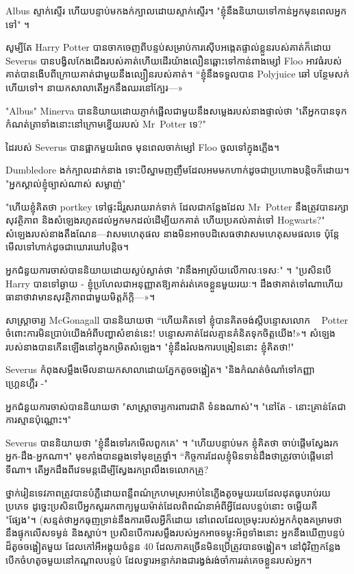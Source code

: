 {{{Albus ស្ទាក់ស្ទើរ ហើយបន្ទាប់មកងក់ក្បាលដោយស្ទាក់ស្ទើរ។ "ខ្ញុំនឹងនិយាយទៅកាន់អ្នកមុនពេលអ្នកទៅ" ។

\later

សូម្បីតែ Harry Potter បានចាកចេញពីបន្ទប់សម្រាប់ការស៊ើបអង្កេតផ្ទាល់ខ្លួនរបស់គាត់ក៏ដោយ Severus បានបង្វិលកែងជើងរបស់គាត់ហើយដើរយ៉ាងលឿនឆ្ពោះទៅកាន់ពាងម្សៅ Floo អាវធំរបស់គាត់បានងើបពីក្រោយគាត់ជាមួយនឹងល្បឿនរបស់គាត់។ “ខ្ញុំនឹងទទួលបាន Polyjuice ឆៅ បន្ថែមសក់ ហើយទៅ។ នាយក​សាលា​តើ​អ្នក​នឹង​ឈរ​នៅ​ក្បែរ—»

"Albus" Minerva បាននិយាយដោយភ្ញាក់ផ្អើលជាមួយនឹងសម្លេងរបស់នាងផ្ទាល់ថា "តើអ្នកបានទុកកំណត់ត្រាទាំងនោះនៅក្រោមខ្នើយរបស់ Mr~Potter ទេ?"

ដៃរបស់ Severus បានផ្អាកមួយរំពេច មុនពេលចាក់ម្សៅ Floo ចូលទៅក្នុងភ្លើង។

Dumbledore ងក់ក្បាលដាក់នាង ទោះបីស្នាមញញឹមដែលអមមកហាក់ដូចជាប្រហោងបន្តិចក៏ដោយ។ "អ្នកស្គាល់ខ្ញុំច្បាស់ណាស់ សម្លាញ់"

"ហើយខ្ញុំគិតថា portkey ទៅផ្ទះដ៏រួសរាយរាក់ទាក់ ដែលជាកន្លែងដែល Mr~Potter នឹងត្រូវបានរក្សាសុវត្ថិភាព និងសំឡេងរហូតដល់អ្នកមកដល់ដើម្បីយកគាត់ ហើយប្រគល់គាត់ទៅ Hogwarts?" សំឡេងរបស់នាងតឹងណែន—វាសមហេតុផល នាងមិនអាចបដិសេធថាវាសមហេតុសមផលទេ ប៉ុន្តែមើលទៅហាក់ដូចជាឃោរឃៅបន្តិច។

អ្នកជំនួយការចាស់បាននិយាយដោយស្ងប់ស្ងាត់ថា "វានឹងអាស្រ័យលើកាលៈទេសៈ" ។ "ប្រសិនបើ Harry បានទៅឆ្ងាយ - ខ្ញុំប្រហែលជាអនុញ្ញាតឱ្យគាត់រត់គេចខ្លួនមួយរយៈ។ ដឹង​ថា​គាត់​ទៅ​ណា​ហើយ​ធានា​ថា​វា​មាន​សុវត្ថិភាព​ជាមួយ​មិត្តភ័ក្ដិ—»។

សាស្ត្រាចារ្យ McGonagall បាននិយាយថា “ហើយគិតទៅ ខ្ញុំបានគិតចង់ស្តីបន្ទោសលោក ~ Potter ចំពោះការមិនប្រាប់យើងអំពីបញ្ហាសំខាន់នេះ! បន្ទោស​គាត់​ដែល​គ្មាន​គំនិត​ទុក​ចិត្ត​យើង!»។ សំឡេងរបស់នាងបានកើនឡើងនៅក្នុងកម្រិតសំឡេង។ "ខ្ញុំនឹងរំលងការបង្រៀននោះ ខ្ញុំគិតថា!"

Severus កំពុងសម្លឹងមើលនាយកសាលាដោយភ្នែកតូចចង្អៀត។ "និងកំណត់ចំណាំទៅកញ្ញា ~ ហ្គ្រេនហ្គឺរ -"

អ្នកជំនួយការចាស់បាននិយាយថា "សាស្ត្រាចារ្យការពារជាតិ ទំនងណាស់"។ "នៅតែ - នោះគ្រាន់តែជាការស្មានប៉ុណ្ណោះ។"

Severus បាននិយាយថា "ខ្ញុំនឹងទៅរកមើលពួកគេ" ។ "ហើយបន្ទាប់មក ខ្ញុំគិតថា ចាប់ផ្តើមស្វែងរកអ្នក-ដឹង-អ្នកណា។" មុខ​ភាំង​បាន​ឆ្លង​ទៅ​មុខ​គ្រូ​ថ្នាំ។ “កិច្ចការ​ដែល​ខ្ញុំ​មិន​ទាន់​ដឹង​ថា​ត្រូវ​ចាប់​ផ្តើម​នៅ​ទីណា។ តើអ្នកដឹងពីវេទមន្តដើម្បីស្វែងរកព្រលឹងទេលោកគ្រូ?

\later

ថ្នាក់រៀនទេវភាពត្រូវបានបំភ្លឺដោយពន្លឺពណ៌ក្រហមស្រអាប់នៃភ្លើងតូចមួយរយដែលដុតធូបរាប់រយប្រភេទ ដូច្នេះប្រសិនបើអ្នកសួររកពាក្យមួយម៉ាត់ដែលពិពណ៌នាអំពីអ្វីដែលបន្ទប់នោះ ចម្លើយគឺ "ផ្សែង"។ (សន្មត់ថាអ្នកធុញទ្រាន់នឹងការមើលអ្វីក៏ដោយ នៅពេលដែលច្រមុះរបស់អ្នកកំពុងគម្រាមថានឹងផ្ទុកលើសទម្ងន់ និងស្លាប់។ ប្រសិនបើការសម្លឹងរបស់អ្នកអាចទម្លុះអ័ព្ទទាំងនោះ អ្នកនឹងឃើញបន្ទប់ដ៏តូចចង្អៀតមួយ ដែលកៅអីអង្គុយចំនួន 40 ដែលភាគច្រើនមិនប្រើត្រូវបានចង្អៀត។ នៅ​ជុំវិញ​កន្លែង​បើក​ចំហ​តូច​មួយ​នៅ​កណ្តាល​បន្ទប់ ដែល​ទ្វារ​អន្ទាក់​រាង​ជា​រង្វង់​រង់ចាំ​ការ​រត់​គេច​ខ្លួន​របស់​អ្នក។

}}}
